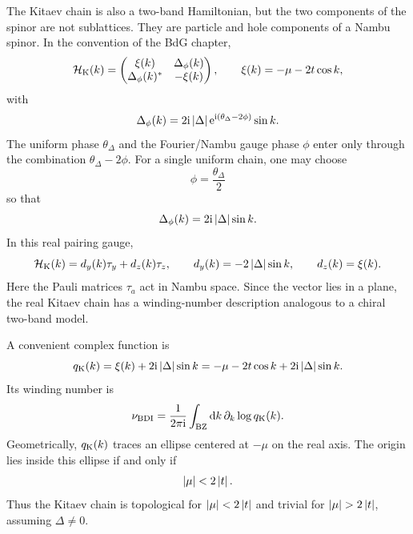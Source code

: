 The Kitaev chain is also a two-band Hamiltonian, but the two components of the
spinor are not sublattices.  They are particle and hole components of a Nambu
spinor.  In the convention of the BdG chapter,
\begin{equation}
\label{eq:topo-kitaev-bdg-block}
    \mathcal{H}_{\rm K}(k)
    =
    \begin{pmatrix}
        \xi(k) & \Delta_\phi(k)\\
        \Delta_\phi(k)^* & -\xi(k)
    \end{pmatrix},
    \qquad
    \xi(k)=-\mu-2t\cos k,
\end{equation}
with
\begin{equation}
\label{eq:topo-kitaev-gap-function}
    \Delta_\phi(k)
    =
    2\mathrm{i}\left|\Delta\right|\mathrm{e}^{\mathrm{i}(\theta_\Delta-2\phi)}\sin k .
\end{equation}
The uniform phase $\theta_\Delta$ and the Fourier/Nambu gauge phase $\phi$ enter
only through the combination $\theta_\Delta-2\phi$.  For a single uniform chain,
one may choose
\begin{equation}
    \phi=\frac{\theta_\Delta}{2}
\end{equation}
so that
\begin{equation}
\label{eq:topo-kitaev-real-gap-gauge}
    \Delta_\phi(k)=2\mathrm{i}\left|\Delta\right|\sin k.
\end{equation}
In this real pairing gauge,
\begin{equation}
\label{eq:topo-kitaev-d-vector}
    \mathcal{H}_{\rm K}(k)
    =
    d_y(k)\tau_y+d_z(k)\tau_z,
    \qquad
    d_y(k)=-2\left|\Delta\right|\sin k,
    \qquad
    d_z(k)=\xi(k).
\end{equation}
Here the Pauli matrices $\tau_a$ act in Nambu space.  Since the vector lies in a
plane, the real Kitaev chain has a winding-number description analogous to a
chiral two-band model.

A convenient complex function is
\begin{equation}
\label{eq:topo-kitaev-q-function}
    q_{\rm K}(k)=\xi(k)+2\mathrm{i}\left|\Delta\right|\sin k
    =-\mu-2t\cos k+2\mathrm{i}\left|\Delta\right|\sin k.
\end{equation}
Its winding number is
\begin{equation}
\label{eq:topo-kitaev-bdi-winding}
    \nu_{\rm BDI}
    =
    \frac{1}{2\pi\mathrm{i}}\int_{\rm BZ}\mathrm{d} k\,
    \partial_k\log q_{\rm K}(k).
\end{equation}
Geometrically, $q_{\rm K}(k)$ traces an ellipse centered at $-\mu$ on the real
axis.  The origin lies inside this ellipse if and only if
\begin{equation}
\label{eq:topo-kitaev-topological-condition}
    \left|\mu\right|<2\left|t\right|.
\end{equation}
Thus the Kitaev chain is topological for $\left|\mu\right|<2\left|t\right|$ and trivial for
$\abs{\mu}>2\abs{t}$, assuming $\Delta\neq0$.

